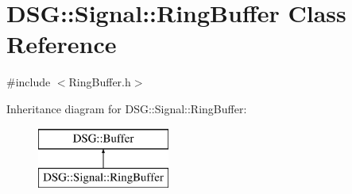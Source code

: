 \hypertarget{classDSG_1_1Signal_1_1RingBuffer}{\section{D\+S\+G\+:\+:Signal\+:\+:Ring\+Buffer Class Reference}
\label{classDSG_1_1Signal_1_1RingBuffer}
}


{\ttfamily \#include $<$Ring\+Buffer.\+h$>$}

Inheritance diagram for D\+S\+G\+:\+:Signal\+:\+:Ring\+Buffer\+:\begin{figure}[H]
\begin{center}
\leavevmode
\includegraphics[height=2.000000cm]{classDSG_1_1Signal_1_1RingBuffer}
\end{center}
\end{figure}
